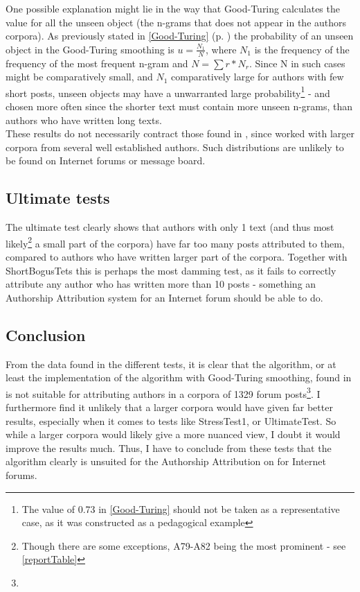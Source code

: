 One possible explanation might lie in the way that Good-Turing calculates the value for all the unseen object (the n-grams that does not appear in the authors corpora). As previously stated in \ref{Good-Turing} (p. \pageref{Good-Turing}) the probability of an unseen object in the Good-Turing smoothing is $u =\frac{N_1}{N}$, where $N_1$ is the frequency of the frequency of the most frequent n-gram and $N =\sum r * N_r$. Since N in such cases might be comparatively small, and $N_1$ comparatively large for authors with few short posts, unseen objects may have a unwarranted large probability\footnote{The value of 0.73 in \ref{Good-Turing} should not be taken as a representative case, as it was constructed as a pedagogical example} - and chosen more often since the shorter text must contain more unseen n-grams, than authors who have written long texts.\\

These results do not necessarily contract those found in \cite{nr4}, since \cite{nr4} worked with larger corpora from several well established authors. Such distributions are unlikely to be found on Internet forums or message board. 

\subsection{Ultimate tests}
The ultimate test clearly shows that authors with only 1 text (and thus most likely\footnote{Though there are some exceptions, A79-A82 being the most prominent - see \ref{reportTable}} a small part of the corpora) have far too many posts attributed to them, compared to authors who have written larger part of the corpora. Together with ShortBogusTets this is perhaps the most damming test, as it fails to correctly attribute any author who has written more than 10 posts - something an Authorship Attribution system for an Internet forum should be able to do.  

\subsection{Conclusion}
From the data found in the different tests, it is clear that the algorithm, or at least the implementation of the algorithm with Good-Turing smoothing, found in \cite{nr4} is not suitable for attributing authors in a corpora of 1329 forum posts\footnote{}. I furthermore find it unlikely that a larger corpora would have given far better results, especially when it comes to tests like StressTest1, or UltimateTest. So while a larger corpora would likely give a more nuanced view, I doubt it would improve the results much. Thus, I have to conclude from these tests that the algorithm clearly is unsuited for the Authorship Attribution on for Internet forums.

